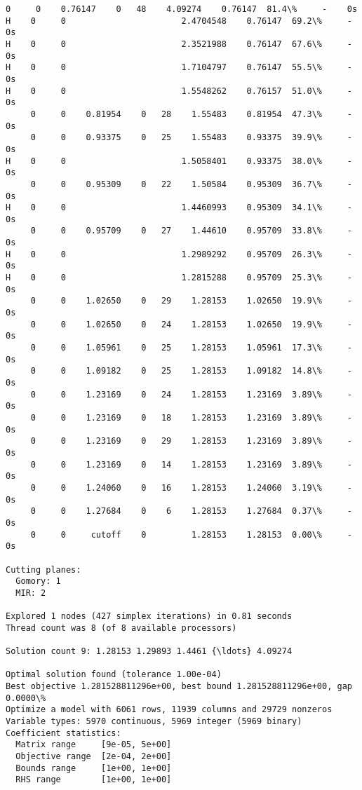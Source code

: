 \documentclass[11pt]{article}
\begin{document}
\begin{Verbatim}[commandchars=\\\{\}]
     0     0    0.76147    0   48    4.09274    0.76147  81.4\%     -    0s
H    0     0                       2.4704548    0.76147  69.2\%     -    0s
H    0     0                       2.3521988    0.76147  67.6\%     -    0s
H    0     0                       1.7104797    0.76147  55.5\%     -    0s
H    0     0                       1.5548262    0.76157  51.0\%     -    0s
     0     0    0.81954    0   28    1.55483    0.81954  47.3\%     -    0s
     0     0    0.93375    0   25    1.55483    0.93375  39.9\%     -    0s
H    0     0                       1.5058401    0.93375  38.0\%     -    0s
     0     0    0.95309    0   22    1.50584    0.95309  36.7\%     -    0s
H    0     0                       1.4460993    0.95309  34.1\%     -    0s
     0     0    0.95709    0   27    1.44610    0.95709  33.8\%     -    0s
H    0     0                       1.2989292    0.95709  26.3\%     -    0s
H    0     0                       1.2815288    0.95709  25.3\%     -    0s
     0     0    1.02650    0   29    1.28153    1.02650  19.9\%     -    0s
     0     0    1.02650    0   24    1.28153    1.02650  19.9\%     -    0s
     0     0    1.05961    0   25    1.28153    1.05961  17.3\%     -    0s
     0     0    1.09182    0   25    1.28153    1.09182  14.8\%     -    0s
     0     0    1.23169    0   24    1.28153    1.23169  3.89\%     -    0s
     0     0    1.23169    0   18    1.28153    1.23169  3.89\%     -    0s
     0     0    1.23169    0   29    1.28153    1.23169  3.89\%     -    0s
     0     0    1.23169    0   14    1.28153    1.23169  3.89\%     -    0s
     0     0    1.24060    0   16    1.28153    1.24060  3.19\%     -    0s
     0     0    1.27684    0    6    1.28153    1.27684  0.37\%     -    0s
     0     0     cutoff    0         1.28153    1.28153  0.00\%     -    0s

Cutting planes:
  Gomory: 1
  MIR: 2

Explored 1 nodes (427 simplex iterations) in 0.81 seconds
Thread count was 8 (of 8 available processors)

Solution count 9: 1.28153 1.29893 1.4461 {\ldots} 4.09274

Optimal solution found (tolerance 1.00e-04)
Best objective 1.281528811296e+00, best bound 1.281528811296e+00, gap 0.0000\%
Optimize a model with 6061 rows, 11939 columns and 29729 nonzeros
Variable types: 5970 continuous, 5969 integer (5969 binary)
Coefficient statistics:
  Matrix range     [9e-05, 5e+00]
  Objective range  [2e-04, 2e+00]
  Bounds range     [1e+00, 1e+00]
  RHS range        [1e+00, 1e+00]


\end{Verbatim}
\end{document}
